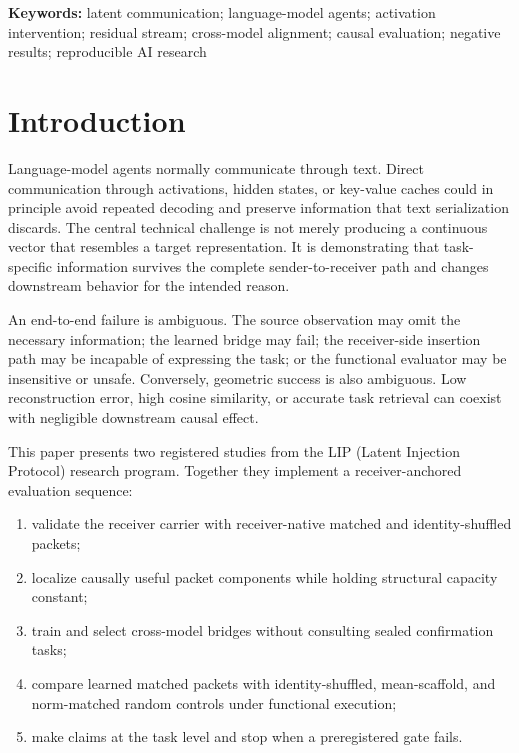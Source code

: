 \documentclass[11pt]{article}
\begin{document}
\noindent\textbf{Keywords:} latent communication; language-model agents; activation intervention; residual stream; cross-model alignment; causal evaluation; negative results; reproducible AI research

\section{Introduction}

Language-model agents normally communicate through text. Direct communication through activations, hidden states, or key-value caches could in principle avoid repeated decoding and preserve information that text serialization discards. The central technical challenge is not merely producing a continuous vector that resembles a target representation. It is demonstrating that task-specific information survives the complete sender-to-receiver path and changes downstream behavior for the intended reason.

An end-to-end failure is ambiguous. The source observation may omit the necessary information; the learned bridge may fail; the receiver-side insertion path may be incapable of expressing the task; or the functional evaluator may be insensitive or unsafe. Conversely, geometric success is also ambiguous. Low reconstruction error, high cosine similarity, or accurate task retrieval can coexist with negligible downstream causal effect.

This paper presents two registered studies from the LIP (Latent Injection Protocol) research program. Together they implement a receiver-anchored evaluation sequence:

\begin{enumerate}
  \item validate the receiver carrier with receiver-native matched and identity-shuffled packets;
  \item localize causally useful packet components while holding structural capacity constant;
  \item train and select cross-model bridges without consulting sealed confirmation tasks;
  \item compare learned matched packets with identity-shuffled, mean-scaffold, and norm-matched random controls under functional execution;
  \item make claims at the task level and stop when a preregistered gate fails.
\end{enumerate}
\end{document}
